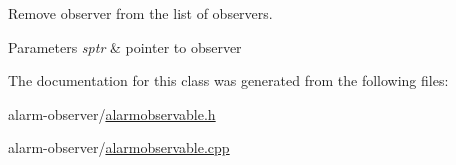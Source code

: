Remove observer from the list of observers. 


\begin{DoxyParams}{Parameters}
{\em sptr} & pointer to observer \\
\hline
\end{DoxyParams}


The documentation for this class was generated from the following files\+:\begin{DoxyCompactItemize}
\item 
alarm-\/observer/\hyperlink{alarmobservable_8h}{alarmobservable.\+h}\item 
alarm-\/observer/\hyperlink{alarmobservable_8cpp}{alarmobservable.\+cpp}\end{DoxyCompactItemize}
